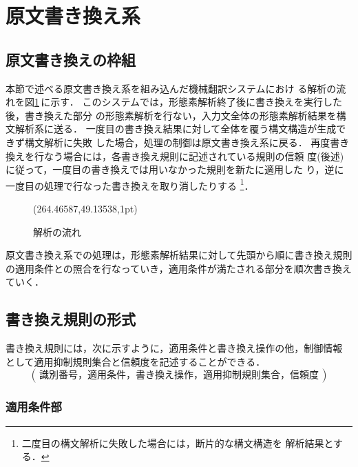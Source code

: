 \section{原文書き換え系}
\label{sec:preedit}

\subsection{原文書き換えの枠組}
\label{sec:preedit:flow}

本節で述べる原文書き換え系を組み込んだ機械翻訳システムにおけ
る解析の流れを図\ref{fig:flow}\,に示す．
このシステムでは，形態素解析終了後に書き換えを実行した後，書き換えた部分
の形態素解析を行ない，入力文全体の形態素解析結果を構文解析系に送る．
一度目の書き換え結果に対して全体を覆う構文構造が生成できず構文解析に失敗
した場合，処理の制御は原文書き換え系に戻る．
再度書き換えを行なう場合には，各書き換え規則に記述されている規則の信頼
度(後述)に従って，一度目の書き換えでは用いなかった規則を新たに適用した
り，逆に一度目の処理で行なった書き換えを取り消したりする
\footnote{二度目の構文解析に失敗した場合には，断片的な構文構造を
解析結果とする．}．
\begin{figure}[htbp]
\begin{center}
    \begin{epsf}
    \end{epsf}
    \begin{draft}
    \atari(264.46587,49.13538,1pt)
    \end{draft}
\end{center}
\caption{解析の流れ}
\label{fig:flow}
\end{figure}

原文書き換え系での処理は，形態素解析結果に対して先頭から順に書き換え規則
の適用条件との照合を行なっていき，適用条件が満たされる部分を順次書き換え
ていく．

\subsection{書き換え規則の形式}
\label{sec:preedit:ruleformat}

書き換え規則には，次に示すように，適用条件と書き換え操作の他，制御情報
として適用抑制規則集合と信頼度を記述することができる．
\[ (\,識別番号，適用条件，書き換え操作，適用抑制規則集合，信頼度\,) \]

\subsubsection{適用条件部}
\label{sec:preedit:ruleformat:condition}

